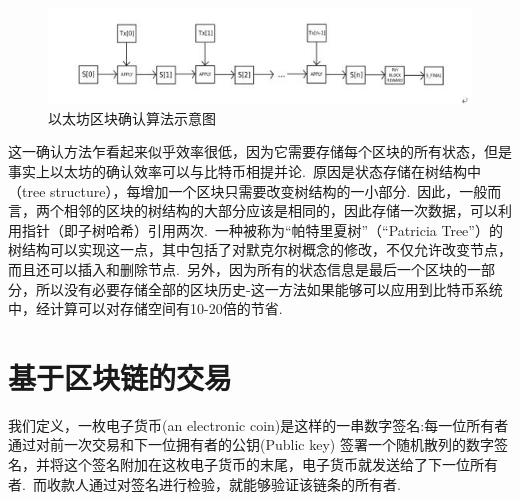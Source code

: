 \documentclass[a4paper,12pt,titlepage]{ctexart}
\begin{document}
\begin{figure}[!hbp]
	\centering
	\includegraphics[scale=0.9]{fig8.jpg}
    \caption{以太坊区块确认算法示意图}
\end{figure}
这一确认方法乍看起来似乎效率很低，因为它需要存储每个区块的所有状态，但是事实上以太坊的确认效率可以与比特币相提并论.~原因是状态存储在树结构中（tree structure），每增加一个区块只需要改变树结构的一小部分.~因此，一般而言，两个相邻的区块的树结构的大部分应该是相同的，因此存储一次数据，可以利用指针（即子树哈希）引用两次.~一种被称为“帕特里夏树”（“Patricia Tree”）的树结构可以实现这一点，其中包括了对默克尔树概念的修改，不仅允许改变节点，而且还可以插入和删除节点.~另外，因为所有的状态信息是最后一个区块的一部分，所以没有必要存储全部的区块历史-这一方法如果能够可以应用到比特币系统中，经计算可以对存储空间有10-20倍的节省.~

\newpage
\section{基于区块链的交易}
我们定义，一枚电子货币(an electronic coin)是这样的一串数字签名:每一位所有者通过对前一次交易和下一位拥有者的公钥(Public key) 签署一个随机散列的数字签名，并将这个签名附加在这枚电子货币的末尾，电子货币就发送给了下一位所有者.~而收款人通过对签名进行检验，就能够验证该链条的所有者.~
\end{document}
